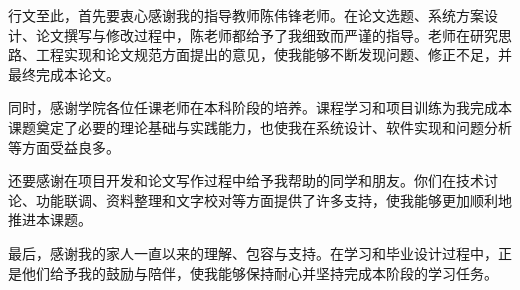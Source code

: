 
\renewcommand{\thechapter}{致谢}


行文至此，首先要衷心感谢我的指导教师陈伟锋老师。在论文选题、系统方案设计、论文撰写与修改过程中，陈老师都给予了我细致而严谨的指导。老师在研究思路、工程实现和论文规范方面提出的意见，使我能够不断发现问题、修正不足，并最终完成本论文。

同时，感谢学院各位任课老师在本科阶段的培养。课程学习和项目训练为我完成本课题奠定了必要的理论基础与实践能力，也使我在系统设计、软件实现和问题分析等方面受益良多。

还要感谢在项目开发和论文写作过程中给予我帮助的同学和朋友。你们在技术讨论、功能联调、资料整理和文字校对等方面提供了许多支持，使我能够更加顺利地推进本课题。

最后，感谢我的家人一直以来的理解、包容与支持。在学习和毕业设计过程中，正是他们给予我的鼓励与陪伴，使我能够保持耐心并坚持完成本阶段的学习任务。
